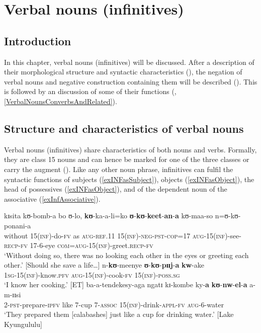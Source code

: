 \chapter{Verbal nouns (infinitives)}
\label{ChapterInfinitives}
\section{Introduction}
In this chapter, verbal nouns (infinitives) will be discussed. After a description of their morphological structure and syntactic characteristics (), the negation of verbal nouns and negative construction containing them will be described (). This is followed by an discussion of some of their functions (, \ref{VerbalNounsConverbsAndRelated}).
\section{Structure and characteristics of verbal nouns}\label{VerbalNounsStructureCharacteristics}
Verbal nouns (infinitives) share characteristics of both nouns and verbs. Formally, they are class 15 nouns and can hence be marked for one of the three  classes or carry the augment (). Like any other noun phrase, infinitives can fulfil the syntactic functions of subjects (\ref{exINFasSubject}), objects (\ref{exINFasObject}), the head of possessives (\ref{exINFasObject}), and of the dependent noun of the associative (\ref{exInfAssociative}).

\begin{exe}
\ex \label{exINFasSubject}
\gll kɪsita kʊ-bomb-a bo ʊ-lo, \textbf{kʊ}-ka-a-li=ko \textbf{ʊ}-\textbf{kʊ}-\textbf{keet}-\textbf{an}-\textbf{a} kʊ-maa-so n=ʊ-kʊ-ponani-a\\
without 15(\textsc{inf})-do-\textsc{fv} as \textsc{aug}-\textsc{ref}.11 15(\textsc{inf})-\textsc{neg}-\textsc{pst}-\textsc{cop}=17 \textsc{aug}-15(\textsc{inf})-see-\textsc{recp}-\textsc{fv} 17-6-eye \textsc{com}=\textsc{aug}-15(\textsc{inf})-greet.\textsc{recp}-\textsc{fv}\\
\glt `Without doing so, there was no looking each other in the eyes or greeting each other.' [Should she save a life\ldots]
\ex \label{exINFasObject} \gll n-\textbf{kʊ}-meenye \textbf{ʊ}-\textbf{kʊ}-\textbf{pɪɪj}-\textbf{a} \textbf{kw}-ake\\
\textsc{1sg}-15(\textsc{inf})-know.\textsc{pfv} \textsc{aug}-15(\textsc{inf})-cook-\textsc{fv} 15(\textsc{inf})-\textsc{poss.sg}\\
\glt \lq I know her cooking.' [ET]
\ex\label{exInfAssociative}
 \gll ba-a-tendekesy-aga ngatɪ kɪ-kombe ky-\textbf{a} \textbf{kʊ}-\textbf{nw}-\textbf{el}-\textbf{a} a-m-ɪɪsi\\
2-\textsc{pst}-prepare-\textsc{ipfv} like 7-cup 7-\textsc{assoc} 15(\textsc{inf})-drink-\textsc{appl}-\textsc{fv} \textsc{aug}-6-water\\
\glt \lq They prepared them [calabashes] just like a cup for drinking water.' [Lake Kyungululu]
\end{exe}

